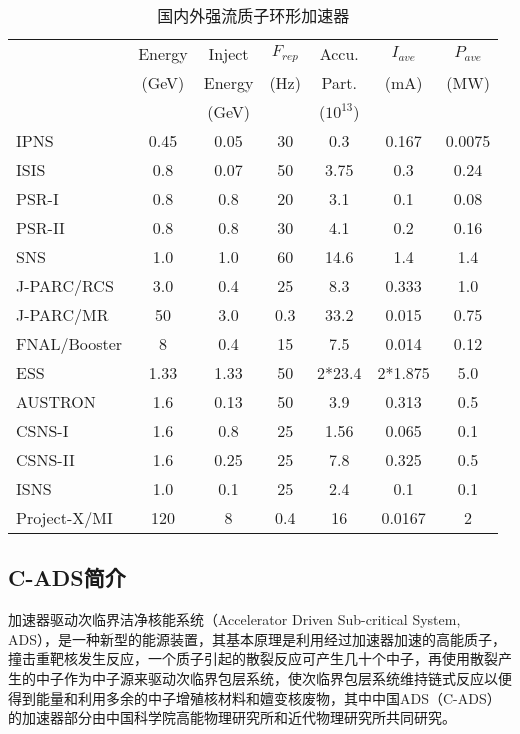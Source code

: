 \begin{table}[!htb]
  \centering
  \begin{tabular}{|>{\small}l|c|c|c|c|c|c|}
    \hline
                &Energy &Inject  &$F_{rep}$ &Accu.    &$I_{ave}$ &$P_{ave}$ \\
                &(GeV)  &Energy  &(Hz)      &Part.    &(mA)      &(MW)      \\
                &       &(GeV)   &          &($10^{13}$) &       &          \\
    \hline
    IPNS        &0.45   &0.05    &30        &0.3      &0.167     &0.0075    \\
    ISIS        &0.8    &0.07    &50        &3.75     &0.3       &0.24      \\
    PSR-I       &0.8    &0.8     &20        &3.1      &0.1       &0.08      \\
    PSR-II      &0.8    &0.8     &30        &4.1      &0.2       &0.16      \\
    SNS         &1.0    &1.0     &60        &14.6     &1.4       &1.4       \\
    J-PARC/RCS  &3.0    &0.4     &25        &8.3      &0.333     &1.0       \\
    J-PARC/MR   &50     &3.0     &0.3       &33.2     &0.015     &0.75      \\
    FNAL/Booster&8      &0.4     &15        &7.5      &0.014     &0.12      \\
    ESS         &1.33   &1.33    &50        &2*23.4   &2*1.875   &5.0       \\
    AUSTRON     &1.6    &0.13    &50        &3.9      &0.313     &0.5       \\
    CSNS-I      &1.6    &0.8     &25        &1.56     &0.065     &0.1       \\
    CSNS-II     &1.6    &0.25    &25        &7.8      &0.325     &0.5       \\
    ISNS        &1.0    &0.1     &25        &2.4      &0.1       &0.1       \\
    Project-X/MI&120    &8       &0.4       &16       &0.0167    &2         \\
    \hline
  \end{tabular}
  \caption{国内外强流质子环形加速器}
  \label{tab:proton_ring}
\end{table}


\subsection{C-ADS简介}
加速器驱动次临界洁净核能系统（Accelerator Driven Sub-critical System, ADS），是一种新型的能源装置，其基本原理是利用经过加速器加速的高能质子，撞击重靶核发生反应，一个质子引起的散裂反应可产生几十个中子，再使用散裂产生的中子作为中子源来驱动次临界包层系统，使次临界包层系统维持链式反应以便得到能量和利用多余的中子增殖核材料和嬗变核废物，其中中国ADS（C-ADS）的加速器部分由中国科学院高能物理研究所和近代物理研究所共同研究。

